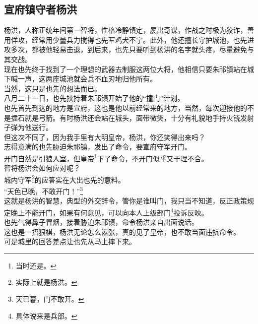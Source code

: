 \begin{multicols}{\theparacolNo}
\subsection{宣府镇守者杨洪}
杨洪，人称正统年间第一智将，性格冷静镇定，屡出奇谋，作战之时极为狡诈，善用佯攻，经常用少量兵力搅得也先军鸡犬不宁。此外，他还擅长守护城池，也先进攻多次，都被他轻易击退，到后来，也先只要听到杨洪的名字就头疼，尽量避免与其交战。\\

现在也先终于找到了一个理想的武器去制服这两位大将，他相信只要朱祁镇站在城下喊一声，这两座城池就会兵不血刃地归他所有。\\

当然，这只是也先的想法而已。\\

八月二十一日，也先挟持着朱祁镇开始了他的“撞门”计划。\\

也先首先到达的地方是宣府，这也是他以前经常来的地方，当然，每次迎接他的不是擂石就是弓箭。有时杨洪还会站在城头，面带微笑，十分有礼貌地手持火铳发射子弹为他送行。\\

但这次不同了，因为我手里有大明皇帝，杨洪，你还笑得出来吗？\\

志得意满的也先胁迫朱祁镇，发出了命令，要宣府守军开门。\\

开门自然是引狼入室，但皇帝\footnote{当时还是。}下了命令，不开门似乎又于理不合。\\

智将杨洪会如何应对呢？\\

城内守军\footnote{实际上就是杨洪。}的应答实在大出也先的意料。\\

“天色已晚，不敢开门！”\footnote{天已暮，门不敢开。}\\

这就是杨洪的智慧，典型的外交辞令，管你是谁叫门，我只当不知道，反正政策规定晚上不能开门，如果有何意见，可以向本人上级部门\footnote{具体说来是兵部。}投诉反映。\\

也先气得鼻子冒烟，接着胁迫朱祁镇，命令杨洪亲自出面说话。\\

这也是一招狠棋，杨洪无论怎么嚣张，真的见了皇帝，也不敢当面违抗命令。\\

可是城里的回答差点让也先从马上摔下来。\\


\end{multicols}

